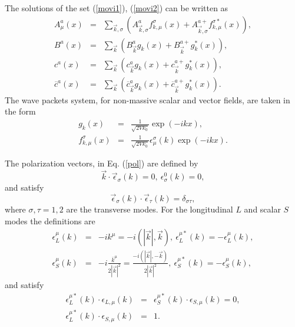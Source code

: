 \documentclass[12pt,letterpaper]{report}
\begin{document}
The solutions of the set (\ref{movi1}), (\ref{movi2}) can be
written as
\begin{eqnarray}
A_\mu ^a\left(x\right) &=&\sum\limits_{\vec{k},\sigma }\left(
A_{\vec{k},\sigma }^af_{k,\mu }^\sigma \left(x\right)
+A_{\vec{k},\sigma }^{a+}f_{k,\mu }^{\sigma *}\left(x\right)
\right), \nonumber \\ B^a\left(x\right)
&=&\sum\limits_{\vec{k}}\left(B_{\vec{k}}^ag_k\left(x\right)
+B_{\vec{k}}^{a+}g_k^{*}\left(x\right) \right), \nonumber \\
c^a\left(x\right) &=&\sum\limits_{\vec{k}}\left(
c_{\vec{k}}^ag_k\left(x\right) +c_{\vec{k}}^{a+}g_k^{*}\left(
x\right) \right), \nonumber \\ \overline{c}^a\left(x\right)
&=&\sum\limits_{\vec{k}}\left(\overline{c}_{ \vec{k}}^ag_k\left(
x\right) +\overline{c}_{\vec{k}}^{a+}g_k^{*}\left(x\right)
\right).
\end{eqnarray}
The wave packets system, for non-massive scalar and vector fields,
are taken in the form
\begin{eqnarray}
g_k\left(x\right) &=&\frac 1{\sqrt{2Vk_0}}\exp \left(-ikx\right),
\nonumber \\ f_{k,\mu }^\sigma \left(x\right) &=&\frac
1{\sqrt{2Vk_0}}\epsilon _\mu ^\sigma \left(k\right) \exp \left(
-ikx\right). \label{pol}
\end{eqnarray}

The polarization vectors, in Eq. (\ref{pol}) are defined by
\[
\vec{k}\cdot \vec{\epsilon}_\sigma \left(k\right) =0,\ \epsilon
_\sigma ^0\left(k\right) =0,
\]
and satisfy
\[
\vec{\epsilon}_\sigma \left(k\right) \cdot \vec{\epsilon}_\tau
\left(k\right) =\delta _{\sigma \tau },
\]
where $\sigma,\tau =1,2$ are the transverse modes. For the
longitudinal $L$ and scalar $S$ modes the definitions are
\begin{eqnarray*}
\epsilon _L^\mu \left(k\right) &=&-ik^\mu =-i\left(\left|
\vec{k}\right|, \vec{k}\right),\ \epsilon _L^{\mu *}\left(
k\right) =-\epsilon _L^\mu \left(k\right), \\ \epsilon _S^\mu
\left(k\right) &=&-i\frac{\overline{k}^\mu }{2\left| \vec{k}
\right| ^2}=\frac{-i\left(\left| \vec{k}\right|,-\vec{k}\right)
}{2\left| \vec{k}\right| ^2},\ \epsilon _S^{\mu *}\left(k\right)
=-\epsilon _S^\mu \left(k\right),
\end{eqnarray*}
and satisfy
\begin{eqnarray*}
\epsilon _L^{\mu *}\left(k\right) \cdot \epsilon _{L,\mu }\left(
k\right) &=&\epsilon _S^{\mu *}\left(k\right) \cdot \epsilon
_{S,\mu }\left(k\right) =0, \\ \epsilon _L^{\mu *}\left(k\right)
\cdot \epsilon _{S,\mu }\left(k\right) &=&1.
\end{eqnarray*}
\end{document}
